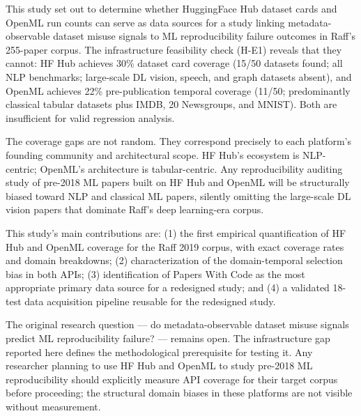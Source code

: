 
This study set out to determine whether HuggingFace Hub dataset cards and OpenML run counts can serve as data sources for a study linking metadata-observable dataset misuse signals to ML reproducibility failure outcomes in Raff's 255-paper corpus. The infrastructure feasibility check (H-E1) reveals that they cannot: HF Hub achieves 30\% dataset card coverage (15/50 datasets found; all NLP benchmarks; large-scale DL vision, speech, and graph datasets absent), and OpenML achieves 22\% pre-publication temporal coverage (11/50; predominantly classical tabular datasets plus IMDB, 20 Newsgroups, and MNIST). Both are insufficient for valid regression analysis.

The coverage gaps are not random. They correspond precisely to each platform's founding community and architectural scope. HF Hub's ecosystem is NLP-centric; OpenML's architecture is tabular-centric. Any reproducibility auditing study of pre-2018 ML papers built on HF Hub and OpenML will be structurally biased toward NLP and classical ML papers, silently omitting the large-scale DL vision papers that dominate Raff's deep learning-era corpus.

This study's main contributions are: (1) the first empirical quantification of HF Hub and OpenML coverage for the Raff 2019 corpus, with exact coverage rates and domain breakdowns; (2) characterization of the domain-temporal selection bias in both APIs; (3) identification of Papers With Code as the most appropriate primary data source for a redesigned study; and (4) a validated 18-test data acquisition pipeline reusable for the redesigned study.

The original research question --- do metadata-observable dataset misuse signals predict ML reproducibility failure? --- remains open. The infrastructure gap reported here defines the methodological prerequisite for testing it. Any researcher planning to use HF Hub and OpenML to study pre-2018 ML reproducibility should explicitly measure API coverage for their target corpus before proceeding; the structural domain biases in these platforms are not visible without measurement.

